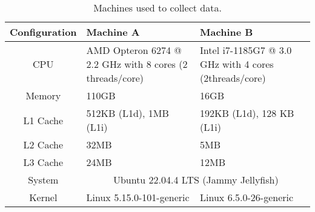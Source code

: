 \begin{table}[H]
\begin{tabular}{cp{5.54cm}p{5.54cm}}
Configuration & Machine A                                                & Machine B                                              \\ \hline
CPU           & AMD Opteron 6274 @ 2.2 GHz with 8 cores (2 threads/core) & Intel i7-1185G7 @ 3.0 GHz with 4 cores (2threads/core) \\ \hline
Memory        & 110GB                                                    & 16GB                                                   \\ \hline
L1 Cache      & 512KB (L1d), 1MB (L1i)                                   & 192KB (L1d), 128 KB (L1i)                              \\ \hline
L2 Cache      & 32MB                                                     & 5MB                                                    \\ \hline
L3 Cache      & 24MB                                                     & 12MB                                                   \\ \hline
System        & \multicolumn{2}{c}{Ubuntu 22.04.4 LTS (Jammy Jellyfish)}                                                          \\ \hline
Kernel        & Linux 5.15.0-101-generic                                 & Linux 6.5.0-26-generic                                
\end{tabular}
\caption{Machines used to collect data.}
\label{table:machines}
\end{table}

